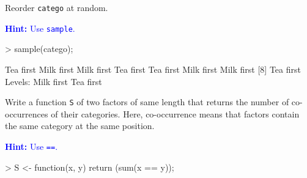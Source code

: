 \documentclass[a4paper]{article}
\theoremstyle{definition}
\begin{document}
\begin{Exercise}
Reorder \texttt{catego} at random.
\par\noindent\textcolor{Blue}{\textbf{Hint:} Use \texttt{sample}.}
\end{Exercise}
\begin{Answer}
\begin{Schunk}
\begin{Sinput}
> sample(catego);
\end{Sinput}
\begin{Soutput}
[1] Tea first  Milk first Milk first Tea first  Tea first  Milk first Milk first
[8] Tea first 
Levels: Milk first Tea first
\end{Soutput}
\end{Schunk}
\end{Answer}

\begin{Exercise}
Write a function \texttt{S} of two factors of same length that
returns the number of co-occurrences of their categories. Here,
co-occurrence means that factors contain the same category at
the same position.
\par\noindent\textcolor{Blue}{\textbf{Hint:} Use \texttt{==}.}
\end{Exercise}
\begin{Answer}
\begin{Schunk}
\begin{Sinput}
> S <- function(x, y) { return (sum(x == y)); }
\end{Sinput}
\end{Schunk}
\end{Answer}
\end{document}
